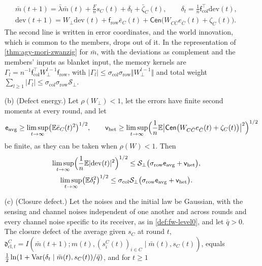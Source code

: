 \begin{theorem}
\begin{enumerate}
\begin{equation}
\begin{gathered}
\bar m(t+1)=\bar\lambda\bar m(t)+\frac Fns_C(t)+\delta_t+\bar\zeta_C(t),\qquad\delta_t=\frac1n\mathsf f_{\mathrm{col}}^\top\mathrm{dev}(t),\\
\mathrm{dev}(t+1)=W_\perp\mathrm{dev}(t)+\mathsf f_{\mathrm{row}}\bar e_C(t)+\mathsf{Cen}\bigl(W_{C\bar C}e_{\bar C}(t)+\zeta_C(t)\bigr).
\end{gathered}
\end{equation}
The second line is written in error coordinates, and the world innovation, which is common to the members, drops out of it. In the representation of \cref{thm:agy-mori-zwanzig} for $\bar m$, with the deviations as complement and the members' inputs as blanket input, the memory kernels are $\Gamma_l=n^{-1}\mathsf f_{\mathrm{col}}^\top W_\perp^{l-1}\mathsf f_{\mathrm{row}}$, with $\lvert\Gamma_l\rvert\le\sigma_{\mathrm{col}}\sigma_{\mathrm{row}}\Vert W_\perp^{l-1}\Vert$ and total weight $\sum_{l\ge1}\lvert\Gamma_l\rvert\le\sigma_{\mathrm{col}}\sigma_{\mathrm{row}}\mathcal S_\perp$.
\item[(b)] (Defect energy.) Let $\rho(W_\perp)<1$, let the errors have finite second moments at every round, and let
\begin{equation*}
\mathsf e_{\mathrm{avg}}\ge\limsup_{t\to\infty}\bigl(\mathbb{E}\bar e_C(t)^2\bigr)^{1/2},\qquad\mathsf v_{\mathrm{het}}\ge\limsup_{t\to\infty}\Bigl(\frac1n\mathbb{E}\bigl\lvert\mathsf{Cen}\bigl(W_{C\bar C}e_{\bar C}(t)+\zeta_C(t)\bigr)\bigr\rvert^2\Bigr)^{1/2}
\end{equation*}
be finite, as they can be taken when $\rho(W)<1$. Then
\begin{equation}\label{eq:apx-level0}
\begin{gathered}
\limsup_{t\to\infty}\Bigl(\frac1n\mathbb{E}\lvert\mathrm{dev}(t)\rvert^2\Bigr)^{1/2}\le\mathcal S_\perp\bigl(\sigma_{\mathrm{row}}\mathsf e_{\mathrm{avg}}+\mathsf v_{\mathrm{het}}\bigr),\\
\limsup_{t\to\infty}\bigl(\mathbb{E}\delta_t^2\bigr)^{1/2}\le\sigma_{\mathrm{col}}\mathcal S_\perp\bigl(\sigma_{\mathrm{row}}\mathsf e_{\mathrm{avg}}+\mathsf v_{\mathrm{het}}\bigr).
\end{gathered}
\end{equation}
\item[(c)] (Closure defect.) Let the noises and the initial law be Gaussian, with the sensing and channel noises independent of one another and across rounds and every channel noise specific to its receiver, as in \cref{def:fw-level0}, and let $\bar q>0$. The closure defect of the average given $s_C$ at round $t$, $\mathfrak d^C_{\mathrm{cl},t}=I(\bar m(t+1);m(t),(s^C_i(t))_{i\in C}\mid\bar m(t),s_C(t))$, equals $\frac12\ln(1+\operatorname{Var}(\delta_t\mid\bar m(t),s_C(t))/\bar q)$, and for $t\ge1$

\end{enumerate}
\end{theorem}
